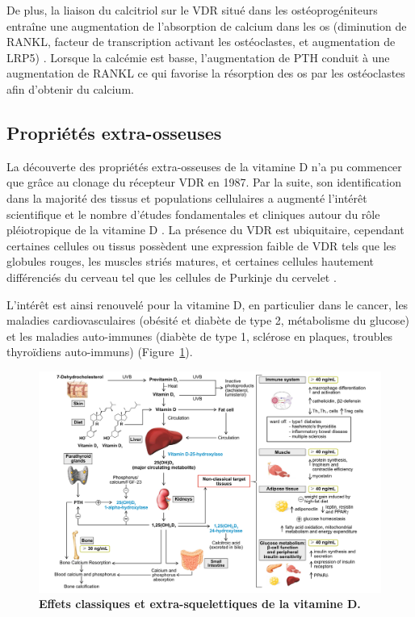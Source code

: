 \documentclass[
  a4paper,
  DIV=11,
  numbers=noendperiod,
  listof=totoc]{scrreprt}
\begin{document}
De plus, la liaison du calcitriol sur le VDR situé dans les
ostéoprogéniteurs entraîne une augmentation de l'absorption de calcium
dans les os (diminution de RANKL, facteur de transcription activant les
ostéoclastes, et augmentation de LRP5) \autocite{Carmeliet.2015}.
Lorsque la calcémie est basse, l'augmentation de PTH conduit à une
augmentation de RANKL ce qui favorise la résorption des os par les
ostéoclastes afin d'obtenir du calcium.

\hypertarget{propriuxe9tuxe9s-extra-osseuses}{%
\subsection{Propriétés
extra-osseuses}\label{propriuxe9tuxe9s-extra-osseuses}}

La découverte des propriétés extra-osseuses de la vitamine D n'a pu
commencer que grâce au clonage du récepteur VDR en 1987. Par la suite,
son identification dans la majorité des tissus et populations
cellulaires a augmenté l'intérêt scientifique et le nombre d'études
fondamentales et cliniques autour du rôle pléiotropique de la vitamine D
\autocite{Rosen.2012}. La présence du VDR est ubiquitaire, cependant
certaines cellules ou tissus possèdent une expression faible de VDR tels
que les globules rouges, les muscles striés matures, et certaines
cellules hautement différenciés du cerveau tel que les cellules de
Purkinje du cervelet \autocite{Bouillon.2008}.

L'intérêt est ainsi renouvelé pour la vitamine D, en particulier dans le
cancer, les maladies cardiovasculaires (obésité et diabète de type 2,
métabolisme du glucose) et les maladies auto-immunes (diabète de type 1,
sclérose en plaques, troubles thyroïdiens auto-immuns)
\autocite{Dankers.2017,Caprio.2017} (Figure~\ref{fig-extra-skeletal}).

\begin{figure}

{\centering \includegraphics{figures/extra-skeletal-effect.png}

}

\caption{\label{fig-extra-skeletal}\textbf{Effets classiques et
extra-squelettiques de la vitamine D.} \textcite{Caprio.2017}}

\end{figure}
\end{document}
